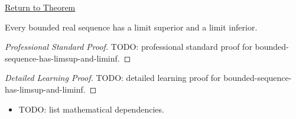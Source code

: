 \newpage
{}
\label{prf:bounded-sequence-has-limsup-and-liminf}

\begin{remark*}[Return]
\hyperref[thm:bounded-sequence-has-limsup-and-liminf]{Return to Theorem}
\end{remark*}

\begin{theorem*}
Every bounded real sequence has a limit superior and a limit inferior.

\smallskip
\noindent
\end{theorem*}

\begin{proof}[Professional Standard Proof]
\LRAProofBodyStart
TODO: professional standard proof for bounded-sequence-has-limsup-and-liminf.
\end{proof}

\begin{proof}[Detailed Learning Proof]
\LRAProofBodyStart
TODO: detailed learning proof for bounded-sequence-has-limsup-and-liminf.
\end{proof}

\begin{remark*}
\end{remark*}

\begin{dependencies}
\begin{itemize}
  \item TODO: list mathematical dependencies.
\end{itemize}
\end{dependencies}

\clearpage
